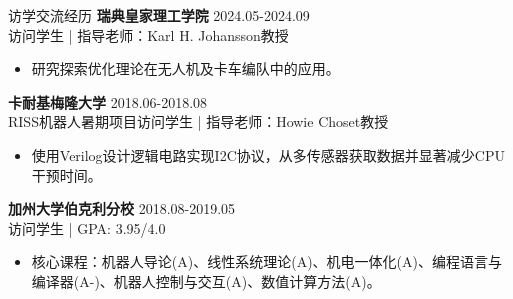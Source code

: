 \documentclass{resume} %
\newcommand{\trianglebullet}{$\mbox{\ensuremath{\rhd}}$}
\begin{document}
\begin{rSection}{访学交流经历}
    \textbf{瑞典皇家理工学院}  \hfill {2024.05-2024.09}
    \\ 访问学生 | 指导老师：Karl H. Johansson教授
    \begin{itemize}
        \item 研究探索优化理论在无人机及卡车编队中的应用。
    \end{itemize}

    \textbf{卡耐基梅隆大学} \hfill {2018.06-2018.08} 
    \\ RISS机器人暑期项目访问学生 | 指导老师：Howie Choset教授
    \begin{itemize}
        \item 使用Verilog设计逻辑电路实现I2C协议，从多传感器获取数据并显著减少CPU干预时间。
    \end{itemize}
    \textbf{加州大学伯克利分校}  \hfill {2018.08-2019.05} 
    \\ 访问学生 | GPA: 3.95/4.0 
    \begin{itemize}
        \item 核心课程：机器人导论(A)、线性系统理论(A)、机电一体化(A)、编程语言与编译器(A-)、机器人控制与交互(A)、数值计算方法(A)。
    \end{itemize}
\end{rSection}




\def\FormatName#1{%
    \def\myname{Junyan Su}%
    \edef\name{#1}%
    \ifx\name\myname
      \underline{#1}%
    \else
       #1%
    \fi
}
\end{document}
